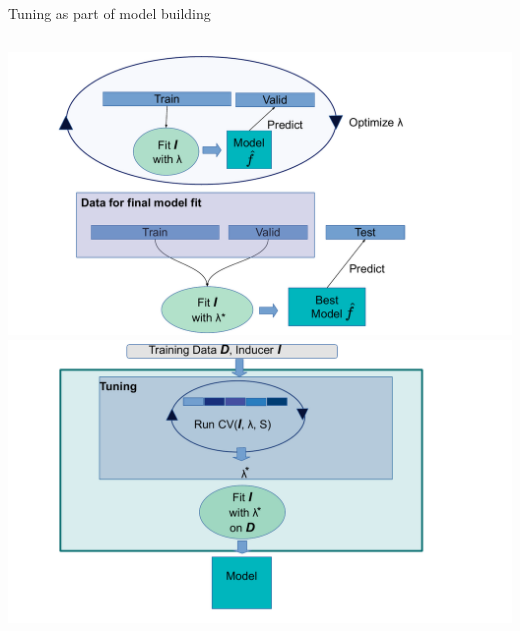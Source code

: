 \begin{vbframe}{Tuning as part of model building}
\vspace{1cm}
\begin{columns}[c, onlytextwidth]
\hspace*{-0.3cm}
\includegraphics[width=1.5\textwidth]{figure_man/train_valid_test.pdf}
\hspace*{-0.7cm}
\includegraphics[width=1.5\textwidth]{figure_man/autotune_in_model_fit.pdf}
\end{columns}
\end{vbframe}

\endlecture

